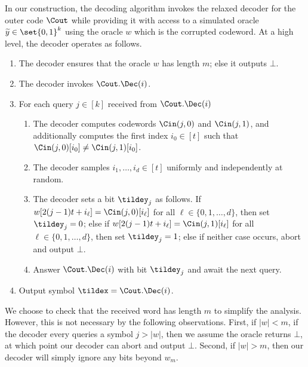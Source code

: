 In our construction, the decoding algorithm invokes the relaxed decoder for the outer code $\Cout$ while providing it with access to a simulated oracle $\widetilde{y} \in \set{0,1}^k$ using the oracle $w$ which is the corrupted codeword.
At a high level, the decoder operates as follows.
\begin{enumerate}
	\item The decoder ensures that the oracle $w$ has length $m$; else it outputs $\bot$.
	
	\item The decoder invokes $\Cout.\Dec(i)$.
	
	\item For each query $j \in [k]$ received from $\Cout.\Dec(i)$
	\begin{enumerate}
		\item The decoder computes codewords $\Cin(j, 0)$ and $\Cin(j,1)$, and additionally computes the first index $i_0 \in [t]$ such that $\Cin(j,0)[i_0] \neq \Cin(j,1)[i_0]$.
		
		\item The decoder samples $i_1,\dotsc, i_d \in [t]$ uniformly and independently at random.
		
		\item The decoder sets a bit $\tildey_j$ as follows. 
		If $w[ 2(j-1)t + i_\ell ] = \Cin(j,0)[i_\ell]$ for all $\ell \in \{0,1,\dotsc, d\}$, then set $\tildey_j = 0$; else if $w[ 2(j-1)t+ i_\ell ] = \Cin(j,1)[i_\ell]$ for all $\ell \in \{0,1,\dotsc, d\}$, then set $\tildey_j = 1$; else if neither case occurs, abort and output $\bot$.
		
		\item Answer $\Cout.\Dec(i)$ with bit $\tildey_j$ and await the next query.
	\end{enumerate}
	
	\item Output symbol $\tildex = \Cout.\Dec(i)$.
\end{enumerate}
\begin{remark}
    We choose to check that the received word has length $m$ to simplify the analysis.
    However, this is not necessary by the following observations.
    First, if $|w| < m$, if the decoder every queries a symbol $j > |w|$, then we assume the oracle returns $\bot$, at which point our decoder can abort and output $\bot$.
    Second, if $|w| > m$, then our decoder will simply ignore any bits beyond $w_m$.
\end{remark}
